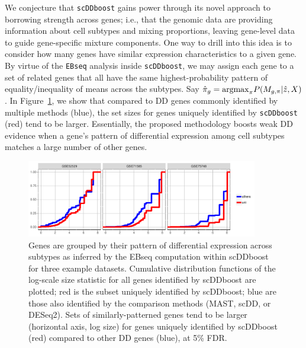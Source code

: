 \documentclass[aoas,preprint]{imsart}
\begin{document}
We conjecture that \verb+scDDboost+ gains power through its novel approach to borrowing strength across genes;
i.e., that the genomic data are providing information about cell subtypes and mixing proportions,
leaving gene-level data to guide gene-specific mixture components. One way to drill into this
idea is to consider how many genes have similar expression characteristics to a given gene.
By virtue of the \verb+EBseq+ analysis inside \verb+scDDboost+, we may assign each gene to
a set of related genes  that all have the same highest-probability pattern of equality/inequality of means across
the subtypes. Say $\hat \pi_g = {\rm argmax}_{\pi} P( M_{g,\pi} | \hat z, X)$. 
In Figure~\ref{fig:shift}, we show
that compared to DD genes commonly identified by multiple methods (blue), the set sizes for genes
uniquely identified by \verb+scDDboost+ (red) tend to be larger.  Essentially, the proposed methodology
 boosts weak DD evidence when a gene's pattern of differential expression among cell subtypes
matches a large number of other genes. 


\begin{figure}[H]
\includegraphics[width = 0.9\textwidth]{Figs/shift.pdf}
 \caption{
 Genes are grouped by their pattern of differential expression across subtypes as inferred by
the EBseq computation within scDDboost for three example datasets.
 Cumulative distribution
functions of the log-scale size statistic for all genes 
 identified by scDDboost are plotted; red is the subset uniquely identified by scDDboost; blue are those also identified by the comparison methods (MAST, scDD, or DESeq2).
 Sets of similarly-patterned genes tend to be larger (horizontal axis, log size) for genes uniquely
 identified by scDDboost (red) compared to other DD genes (blue), at 5\% FDR.}
  \label{fig:shift}
\end{figure}
\end{document}
